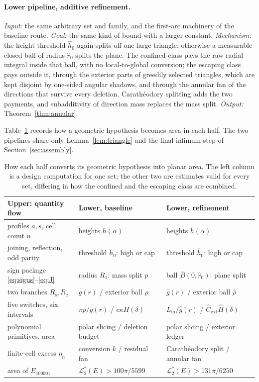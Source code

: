 \documentclass[11pt]{article}
\theoremstyle{plain}
\theoremstyle{definition}
\theoremstyle{remark}
\newcommand{\Lout}{\mathcal{L}^{*}_{2}}
\newcommand{\Rsta}{R_{\mathrm{s}}}
\newcommand{\Rend}{R_{\mathrm{e}}}
\begin{document}
\paragraph{Lower pipeline, additive refinement.}
\emph{Input:} the same arbitrary set and family, and the first-arc machinery of
the baseline route. \emph{Goal:} the same kind of bound with a larger constant.
\emph{Mechanism:} the height threshold $\hat h_{0}$ again splits off one large
triangle; otherwise a measurable closed ball of radius $\hat r_{0}$ splits the
plane. The confined class pays the raw radial integral inside that ball, with no
local-to-global conversion; the escaping class pays outside it, through the
exterior parts of greedily selected triangles, which are kept disjoint by
one-sided angular shadows, and through the annular fan of the directions that
survive every deletion. Carath\'eodory splitting adds the two payments, and
subadditivity of direction mass replaces the mass split. \emph{Output:}
Theorem~\ref{thm:annular}.

Table~\ref{tab:flow} records how a geometric hypothesis becomes area in each
half. The two pipelines share only Lemma~\ref{lem:triangle} and the final
infimum step of Section~\ref{sec:assembly}.

\begin{table}[t]
\centering
\small
\begin{tabular}{@{}lll@{}}
\toprule
Upper: quantity flow & Lower, baseline & Lower, refinement \\
\midrule
profiles $a,s$, cell count $n$
  & heights $h(\alpha)$
  & heights $h(\alpha)$\\
joining, reflection, odd parity
  & threshold $h_{0}$: high or cap
  & threshold $\hat h_{0}$: high or cap\\
sign package \eqref{eq:signs}--\eqref{eq:J}
  & radius $R_{1}$: mass split $p$
  & ball $\overline B(0,\hat r_{0})$: plane split\\
two branches $\Rsta,\Rend$
  & $g(r)$ / exterior ball $\rho$
  & $\hat g(r)$ / exterior ball $\hat\rho$\\
five switches, six intervals
  & $\pi p/g(r)$ / $c\kappa H(\delta)$
  & $L_{\mathrm{in}}/\hat g(r)$ /
    $\hat C_{\mathrm{ext}}\hat H(\delta)$\\
polynomial primitives, area
  & polar slicing / deletion budget
  & polar slicing / exterior ledger\\
finite-cell excess $\eta_{n}$
  & conversion $k$ / residual fan
  & Carath\'eodory split / annular fan\\
area of $E_{100001}$
  & $\Lout(E)>100\pi/5599$
  & $\Lout(E)>131\pi/6250$\\
\bottomrule
\end{tabular}
\caption{How each half converts its geometric hypothesis into planar area. The
left column is a design computation for one set; the other two are estimates
valid for every set, differing in how the confined and the escaping class are
combined.}
\label{tab:flow}
\end{table}
\end{document}
